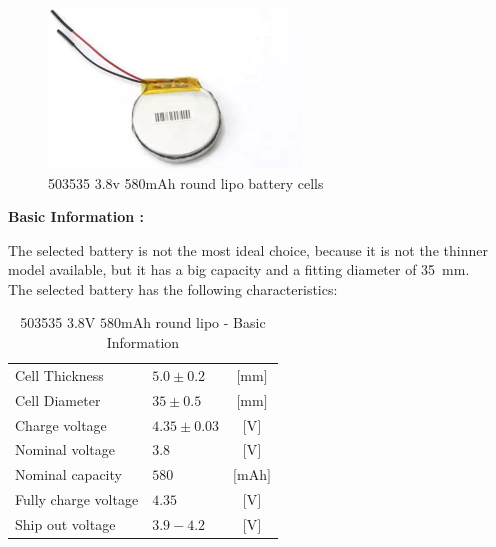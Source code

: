 \documentclass[report.tex]{subfiles}
\begin{document}
\begin{figure}[H]
	\centering
	\includegraphics[width=0.6\textwidth]{Include/Figure/Hardware/503535RLipo.png}
	\caption{503535 3.8v 580mAh round lipo battery cells \cite{503535RLipo}}
	\label{fig:503535RLipo}
\end{figure}

\pagebreak

\textbf{Basic Information :}

The selected battery is not the most ideal choice, because it is not the thinner model available, but it has a big capacity and a fitting diameter of \SI{35}{\milli\meter}.\\

The selected battery has the following characteristics:
\begin{table}[H]
\centering
\begin{tabular}{|l|l|c|}\hline
Cell Thickness 		&	$5.0 \pm 0.2$	& $\si{[\milli\meter]}$\\
Cell Diameter 		&	$35 \pm 0.5$ 	& 	$\si{[\milli\meter]}$\\
Charge voltage		&	$4.35 \pm 0.03$	&	$\si{[\volt]}$\\
Nominal voltage		&	$3.8$ 			&	$\si{[\volt]}$\\
Nominal capacity		&	$580$			&	$\si{[\milli\ampere\hour]}$\\
Fully charge voltage	&	$4.35$ 			&	$\si{[\volt]}$\\
Ship out voltage		&	$3.9 - 4.2 $		&	$\si{[\volt]}$\\\hline
\end{tabular}
\caption{503535 $3.8\si{\volt}$ $580\text{mAh}$ round lipo - Basic Information \cite{roundLipoCell}}
\label{tab:503535RLipo_basic_info}
\end{table}
\end{document}
